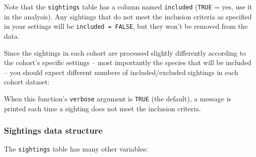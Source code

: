 \documentclass[
]{book}
\newenvironment{Shaded}{\begin{snugshade}}{\end{snugshade}}
\newcommand{\DecValTok}[1]{\textcolor[rgb]{0.00,0.00,0.81}{#1}}
\newcommand{\NormalTok}[1]{#1}
\newcommand{\OperatorTok}[1]{\textcolor[rgb]{0.81,0.36,0.00}{\textbf{#1}}}
\newcommand{\OtherTok}[1]{\textcolor[rgb]{0.56,0.35,0.01}{#1}}
\newcommand{\StringTok}[1]{\textcolor[rgb]{0.31,0.60,0.02}{#1}}
\begin{document}
Note that the \texttt{sightings} table has a column named \texttt{included} (\texttt{TRUE} = yes, use it in the analysis). Any sightings that do not meet the inclusion criteria as specified in your settings will be \texttt{included\ =\ FALSE}, but they won't be removed from the data.

Since the sightings in each cohort are processed slightly differently according to the cohort's specific settings -- most importantly the species that will be included -- you should expect different numbers of included/excluded sightings in each cohort dataset:

\begin{Shaded}
\end{Shaded}

When this function's \texttt{verbose} argument is \texttt{TRUE} (the default), a message is printed each time a sighting does not meet the inclusion criteria.

\hypertarget{sightings-data-structure}{%
\subsubsection*{Sightings data structure}\label{sightings-data-structure}}

The \texttt{sightings} table has many other variables:
\end{document}
